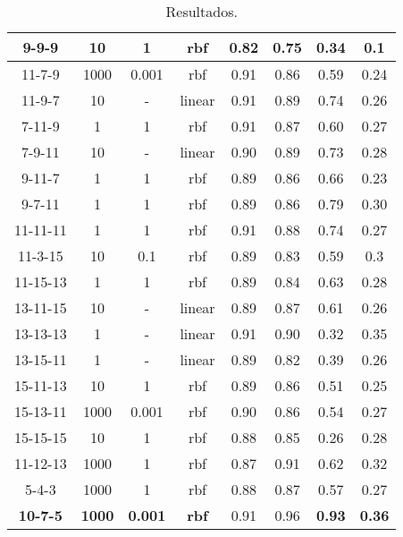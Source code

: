 \begin{table}[H]
\begin{center}
\begin{tabular}{|c|c|c|c|c|c|c|c|}
\multicolumn{1}{|c|}{9-9-9} & 10 & 1 & rbf & 0.82 & 0.75 & 0.34 & 0.1 \\ \hline
\multicolumn{1}{|c|}{11-7-9} & 1000 & 0.001 & rbf & 0.91 & 0.86 & 0.59 & 0.24 \\ \hline
\multicolumn{1}{|c|}{11-9-7} & 10 & - & linear & 0.91 & 0.89 & 0.74 & 0.26 \\ \hline
\multicolumn{1}{|c|}{7-11-9} & 1 & 1 & rbf & 0.91 & 0.87 & 0.60 & 0.27 \\ \hline
\multicolumn{1}{|c|}{7-9-11} & 10 & - & linear & 0.90 & 0.89 & 0.73 & 0.28 \\ \hline
\multicolumn{1}{|c|}{9-11-7} & 1 & 1 & rbf & 0.89 & 0.86 & 0.66 & 0.23 \\ \hline
\multicolumn{1}{|c|}{9-7-11} & 1 & 1 & rbf & 0.89 & 0.86 & 0.79 & 0.30\\ \hline
\multicolumn{1}{|c|}{11-11-11} & 1 & 1 & rbf & 0.91 & 0.88 & 0.74 & 0.27 \\ \hline
\multicolumn{1}{|c|}{11-3-15} & 10 & 0.1 & rbf & 0.89 & 0.83 & 0.59 & 0.3 \\ \hline
\multicolumn{1}{|c|}{11-15-13} & 1 & 1 & rbf & 0.89 & 0.84 & 0.63 & 0.28 \\ \hline
\multicolumn{1}{|c|}{13-11-15} & 10 & - & linear & 0.89 & 0.87 & 0.61 & 0.26 \\ \hline
\multicolumn{1}{|c|}{13-13-13} & 1 & - & linear & 0.91 & 0.90 & 0.32 & 0.35 \\ \hline
\multicolumn{1}{|c|}{13-15-11} & 1 & - & linear & 0.89 & 0.82 & 0.39 & 0.26 \\ \hline
\multicolumn{1}{|c|}{15-11-13} & 10 & 1 & rbf & 0.89 & 0.86 & 0.51 & 0.25 \\ \hline
\multicolumn{1}{|c|}{15-13-11} & 1000 & 0.001 & rbf & 0.90 & 0.86 & 0.54 & 0.27 \\ \hline
\multicolumn{1}{|c|}{15-15-15} & 10 & 1 & rbf & 0.88 & 0.85 & 0.26 & 0.28 \\ \hline
\multicolumn{1}{|c|}{11-12-13} & 1000 & 1 & rbf & 0.87 & 0.91 & 0.62 & 0.32 \\ \hline
\multicolumn{1}{|c|}{5-4-3} & 1000 & 1 & rbf & 0.88 & 0.87 & 0.57 & 0.27 \\ \hline
\multicolumn{1}{|c|}{\textbf{10-7-5}} & \textbf{1000} &\textbf{ 0.001} & \textbf{rbf} & 0.91 & 0.96 &\cellcolor{blue!25}\textbf{0.93} & \cellcolor{blue!25}\textbf{0.36}\\ \hline
\end{tabular}
\end{center}\caption{Resultados.}\label{tab:entrenam-result}
\end{table}

